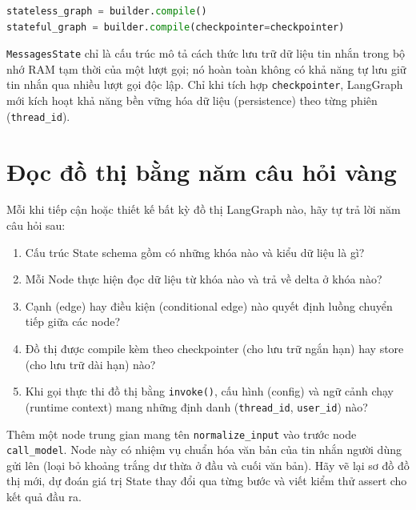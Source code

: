 \begin{lstlisting}[language=Python,caption={Cùng graph, khác năng lực lưu state}]
stateless_graph = builder.compile()
stateful_graph = builder.compile(checkpointer=checkpointer)
\end{lstlisting}

\begin{aiwarning}
\texttt{MessagesState} chỉ là cấu trúc mô tả cách thức lưu trữ dữ liệu tin nhắn trong bộ nhớ RAM tạm thời của một lượt gọi; nó hoàn toàn không có khả năng tự lưu giữ tin nhắn qua nhiều lượt gọi độc lập. Chỉ khi tích hợp \texttt{checkpointer}, LangGraph mới kích hoạt khả năng bền vững hóa dữ liệu (persistence) theo từng phiên (\texttt{thread\_id}).
\end{aiwarning}

\section{Đọc đồ thị bằng năm câu hỏi vàng}

Mỗi khi tiếp cận hoặc thiết kế bất kỳ đồ thị LangGraph nào, hãy tự trả lời năm câu hỏi sau:
\begin{enumerate}
  \item Cấu trúc State schema gồm có những khóa nào và kiểu dữ liệu là gì?
  \item Mỗi Node thực hiện đọc dữ liệu từ khóa nào và trả về delta ở khóa nào?
  \item Cạnh (edge) hay điều kiện (conditional edge) nào quyết định luồng chuyển tiếp giữa các node?
  \item Đồ thị được compile kèm theo checkpointer (cho lưu trữ ngắn hạn) hay store (cho lưu trữ dài hạn) nào?
  \item Khi gọi thực thi đồ thị bằng \texttt{invoke()}, cấu hình (config) và ngữ cảnh chạy (runtime context) mang những định danh (\texttt{thread\_id}, \texttt{user\_id}) nào?
\end{enumerate}

\begin{aicheckpoint}
Thêm một node trung gian mang tên \texttt{normalize\_input} vào trước node \texttt{call\_model}. Node này có nhiệm vụ chuẩn hóa văn bản của tin nhắn người dùng gửi lên (loại bỏ khoảng trắng dư thừa ở đầu và cuối văn bản). Hãy vẽ lại sơ đồ đồ thị mới, dự đoán giá trị State thay đổi qua từng bước và viết kiểm thử assert cho kết quả đầu ra.
\end{aicheckpoint}
